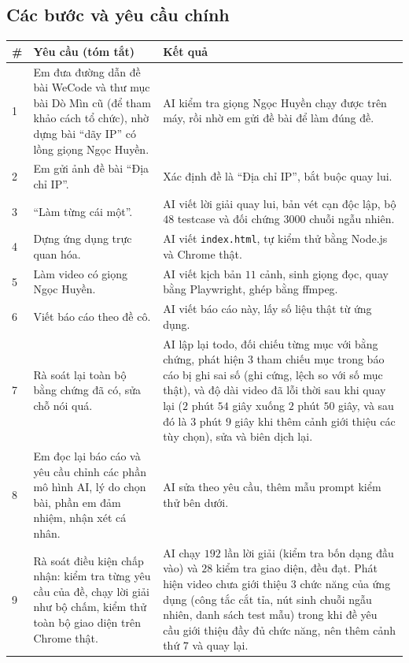 \documentclass[12pt,a4paper]{article}
\begin{document}
\subsection{Các bước và yêu cầu chính}\label{sec:testprompt}
\begin{table}[H]
\centering
\small
\begin{tabularx}{\textwidth}{@{}p{0.4cm}p{5.4cm}X@{}}
\toprule
\textbf{\#} & \textbf{Yêu cầu (tóm tắt)} & \textbf{Kết quả} \\
\midrule
1 & Em đưa đường dẫn đề bài WeCode và thư mục bài Dò Mìn cũ (để tham khảo cách tổ chức), nhờ dựng bài ``dãy IP'' có lồng giọng Ngọc Huyền. & AI kiểm tra giọng Ngọc Huyền chạy được trên máy, rồi nhờ em gửi đề bài để làm đúng đề. \\
2 & Em gửi ảnh đề bài ``Địa chỉ IP''. & Xác định đề là ``Địa chỉ IP'', bắt buộc quay lui. \\
3 & ``Làm từng cái một''. & AI viết lời giải quay lui, bản vét cạn độc lập, bộ $48$ testcase và đối chứng $3000$ chuỗi ngẫu nhiên. \\
4 & Dựng ứng dụng trực quan hóa. & AI viết \texttt{index.html}, tự kiểm thử bằng Node.js và Chrome thật. \\
5 & Làm video có giọng Ngọc Huyền. & AI viết kịch bản $11$ cảnh, sinh giọng đọc, quay bằng Playwright, ghép bằng ffmpeg. \\
6 & Viết báo cáo theo đề cô. & AI viết báo cáo này, lấy số liệu thật từ ứng dụng. \\
7 & Rà soát lại toàn bộ bằng chứng đã có, sửa chỗ nói quá. & AI lập lại todo, đối chiếu từng mục với bằng chứng, phát hiện $3$ tham chiếu mục trong báo cáo bị ghi sai số (ghi cứng, lệch so với số mục thật), và độ dài video đã lỗi thời sau khi quay lại ($2$ phút $54$ giây xuống $2$ phút $50$ giây, và sau đó là $3$ phút $9$ giây khi thêm cảnh giới thiệu các tùy chọn), sửa và biên dịch lại. \\
8 & Em đọc lại báo cáo và yêu cầu chỉnh các phần mô hình AI, lý do chọn bài, phần em đảm nhiệm, nhận xét cá nhân. & AI sửa theo yêu cầu, thêm mẫu prompt kiểm thử bên dưới. \\
9 & Rà soát điều kiện chấp nhận: kiểm tra từng yêu cầu của đề, chạy lời giải như bộ chấm, kiểm thử toàn bộ giao diện trên Chrome thật. & AI chạy $192$ lần lời giải (kiểm tra bốn dạng đầu vào) và $28$ kiểm tra giao diện, đều đạt. Phát hiện video chưa giới thiệu $3$ chức năng của ứng dụng (công tắc cắt tỉa, nút sinh chuỗi ngẫu nhiên, danh sách test mẫu) trong khi đề yêu cầu giới thiệu đầy đủ chức năng, nên thêm cảnh thứ $7$ và quay lại. \\
\bottomrule
\end{tabularx}
\end{table}
\end{document}
